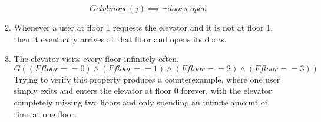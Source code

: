 \documentclass{article}
\begin{document}
\begin{enumerate}
\begin{enumerate}
      \[ G elv!move(j) \implies \neg doors\_open \]
    \item Whenever a user at floor 1 requests the elevator and it is not at
      floor 1, then it eventually arrives at that floor and opens its doors.
    \item The elevator visits every floor infinitely often.
      \[G \left( (F floor == 0) \wedge (F floor == 1)
      \wedge (F floor == 2) \wedge (F floor == 3) \right) \]
      Trying to verify this property produces a counterexample, where one
      user simply exits and enters the elevator at floor 0
      forever, with the elevator completely missing two floors
      and only spending an infinite amount of time at one floor.
  \end{enumerate}
\end{enumerate}

%
%
\end{document}
